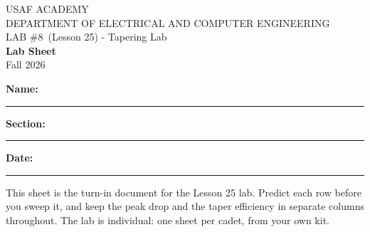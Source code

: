 \documentclass{exam}
\def\labNum{\labNumIn}
\def\labNum{8}
\def\thisterm{\thisTermIn}
\def\thisterm{Fall 2026}
\begin{document}
\pagestyle{headandfoot}   %



\begin{center}
USAF ACADEMY \\
DEPARTMENT OF ELECTRICAL AND COMPUTER ENGINEERING \\
LAB \#\labNum\ (Lesson 25) - Tapering Lab \\
\textbf{Lab Sheet} \\
\thisterm \\[4mm]
\end{center}

\vspace{-4pt}
\textbf{Name:} \rule[-2pt]{2.6in}{0.4pt} \hfill
\textbf{Section:} \rule[-2pt]{0.9in}{0.4pt} \hfill
\textbf{Date:} \rule[-2pt]{1.1in}{0.4pt}

\vspace{4pt}


\vspace{2pt}

This sheet is the turn-in document for the Lesson 25 lab. Predict each row
before you sweep it, and keep the peak drop and the taper efficiency in separate
columns throughout. The lab is individual: one sheet per cadet, from your own kit.
\end{document}
